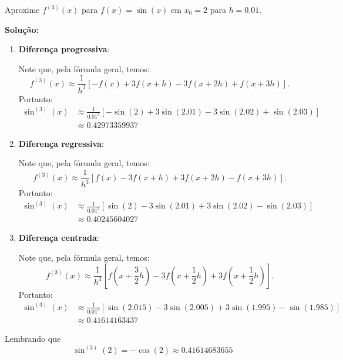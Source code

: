 \documentclass[12pt,openany]{book}
\begin{document}
\begin{example}{}{}
    Aproxime $f^{(3)}(x)$ para $f(x) = \sin(x)$ em $x_0 = 2$ para $h = 0.01$.

    \vspace{1em}

    \textbf{Solução:}
    \begin{enumerate}[label=(\roman*)]
        \item \textbf{Diferença progressiva}:
        
            Note que, pela fórmula geral, temos:
            \[
                f^{(3)}(x) \approx \frac{1}{h^{3}}\left[ -f(x) + 3f(x + h) - 3f(x + 2h) + f(x + 3h) \right].
            \]
            Portanto:
            \[
                \begin{aligned}
                    \sin^{(3)}(x) &\approx \frac{1}{0.01^3}\left[ -\sin(2) + 3\sin(2.01) - 3\sin(2.02) + \sin(2.03) \right] \\
                    &\approx 0.42973359937
                \end{aligned}
            \]
        
        \item \textbf{Diferença regressiva}:
            
            Note que, pela fórmula geral, temos:
            \[
                f^{(3)}(x) \approx \frac{1}{h^{3}}\left[ f(x) - 3f(x + h) + 3f(x + 2h) - f(x + 3h) \right].
            \]
            Portanto:
            \[
                \begin{aligned}
                    \sin^{(3)}(x) &\approx \frac{1}{0.01^3}\left[ \sin(2) - 3\sin(2.01) + 3\sin(2.02) - \sin(2.03) \right] \\
                    &\approx 0.40245604027
                \end{aligned}
            \]

        \item \textbf{Diferença centrada}:
        
            Note que, pela fórmula geral, temos:
            \[
                f^{(3)}(x) \approx \frac{1}{h^{3}}\left[ f\left(x + \frac{3}{2}h\right) - 3f\left(x + \frac{1}{2}h\right) + 3f\left(x + \frac{1}{2}h\right) \right].
            \]
            Portanto:
            \[
                \begin{aligned}
                    \sin^{(3)}(x) &\approx \frac{1}{0.01^3}\left[ \sin(2.015) - 3\sin(2.005) + 3\sin(1.995) - \sin(1.985) \right] \\
                    &\approx 0.41614163437
                \end{aligned}
            \]
    \end{enumerate}

    Lembrando que
    \[
        \sin^{(3)}(2) = -\cos(2) \approx 0.41614683655
    \]
\end{example}
\end{document}
